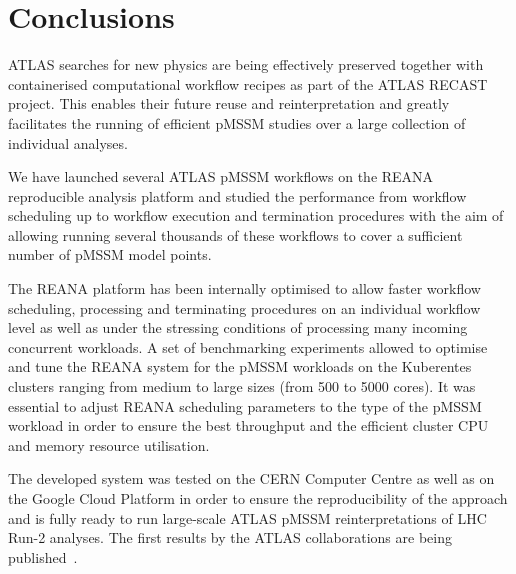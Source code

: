 \section{Conclusions}\label{sec:conclusions}

ATLAS searches for new physics are being effectively preserved together with containerised computational workflow recipes as part of the ATLAS RECAST project.
This enables their future reuse and reinterpretation and greatly facilitates the running of efficient pMSSM studies over a large collection of individual analyses.

We have launched several ATLAS pMSSM workflows on the REANA reproducible analysis platform and studied the performance from workflow scheduling up to workflow execution and termination procedures with the aim of allowing running several thousands of these workflows to cover a sufficient number of pMSSM model points.

The REANA platform has been internally optimised to allow faster workflow scheduling, processing and terminating procedures on an individual workflow level as well as under the stressing conditions of processing many incoming concurrent workloads.
A set of benchmarking experiments allowed to optimise and tune the REANA system for the pMSSM workloads on the Kuberentes clusters ranging from medium to large sizes (from 500 to 5000 cores).
It was essential to adjust REANA scheduling parameters to the type of the pMSSM workload in order to ensure the best throughput and the efficient cluster CPU and memory resource utilisation.

The developed system was tested on the CERN Computer Centre as well as on the Google Cloud Platform in order to ensure the reproducibility of the approach and is fully ready to run large-scale ATLAS pMSSM reinterpretations of LHC Run-2 analyses.
The first results by the ATLAS collaborations are being published~\cite{ref:ATLAS-CONF-2023-055}.
